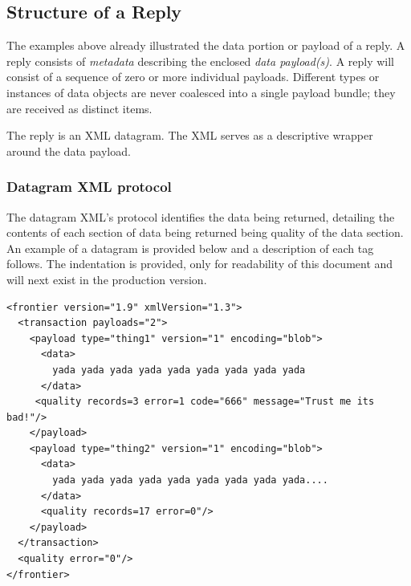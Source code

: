\subsection{Structure of a Reply}

The examples above already illustrated the data portion or payload of a reply.
A reply consists of \emph{metadata} describing the enclosed
\emph{data payload(s)}.
A reply will consist of a sequence of zero or more individual payloads.
Different types or instances of data objects are never coalesced into a single
payload bundle; they are received as distinct items.

The reply is an XML datagram.  The XML serves as a descriptive wrapper
around the data payload.

\subsubsection{Datagram XML protocol}

The datagram XML's protocol identifies the data being returned, detailing the contents 
of each section of data being returned being quality of the data section. An example of a 
datagram is provided below and a description of each tag follows. The indentation is provided, only
for readability of this document and will next exist in the production version.

\begin{verbatim}
<frontier version="1.9" xmlVersion="1.3">
  <transaction payloads="2">
    <payload type="thing1" version="1" encoding="blob">
      <data>
        yada yada yada yada yada yada yada yada yada
      </data>
     <quality records=3 error=1 code="666" message="Trust me its bad!"/>
    </payload>
    <payload type="thing2" version="1" encoding="blob">
      <data>
        yada yada yada yada yada yada yada yada yada....
      </data>
      <quality records=17 error=0"/>
    </payload>
  </transaction>
  <quality error="0"/>
</frontier>
\end{verbatim}

